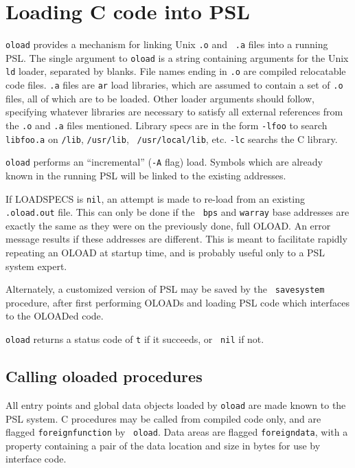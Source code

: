 

\section{Loading C code into PSL}


{\tt oload} provides a mechanism for linking Unix {\tt .o} and {\tt
.a} files into a running PSL.  The single argument to {\tt oload} is a
string containing arguments for the Unix {\tt ld} loader, separated by
blanks.  File names ending in {\tt .o} are compiled relocatable code
files.  {\tt .a} files are {\tt ar} load libraries, which are assumed
to contain a set of {\tt .o} files, all of which are to be loaded.
Other loader arguments should follow, specifying whatever libraries
are necessary to satisfy all external references from the {\tt .o} and
{\tt .a} files mentioned.  Library specs are in the form {\tt -lfoo}
to search {\tt libfoo.a} on {\tt /lib}, {\tt /usr/lib}, {\tt
/usr/local/lib}, etc.  {\tt -lc} searchs the C library.

{\tt oload} performs an ``incremental'' ({\tt -A} flag) load.  Symbols
which are already known in the running PSL will be linked to the
existing addresses.

If LOADSPECS is {\tt nil}, an attempt is made to re-load from an
existing {\tt .oload.out} file.  This can only be done if the {\tt
bps} and {\tt warray} base addresses are exactly the same as they were
on the previously done, full OLOAD.  An error message results if these
addresses are different.  This is meant to facilitate rapidly
repeating an OLOAD at startup time, and is probably useful only to a
PSL system expert.

Alternately, a customized version of PSL may be saved by the {\tt
savesystem} procedure, after first performing OLOADs and loading PSL
code which interfaces to the OLOADed code.

{\tt oload} returns a status code of {\tt t} if it succeeds, or {\tt
nil} if not.

\subsection{Calling oloaded procedures}

All entry points and global data objects loaded by {\tt oload} are
made known to the PSL system.  C procedures may be called from
compiled code only, and are flagged {\tt foreignfunction} by {\tt
oload}.  Data areas are flagged {\tt foreigndata}, with a property
containing a pair of the data location and size in bytes for use by
interface code.

